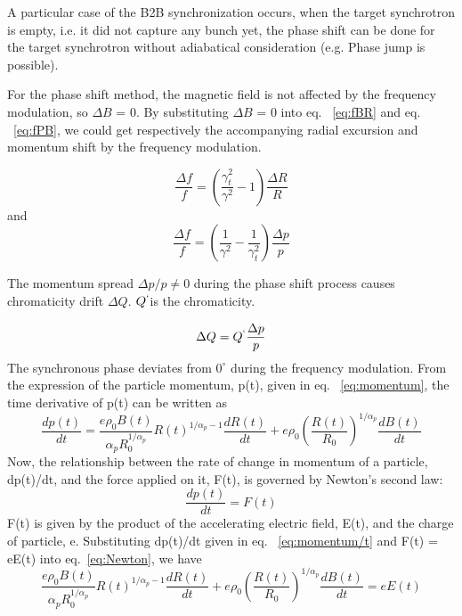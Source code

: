 A particular case of the B2B synchronization occurs, when the target synchrotron is empty, i.e. it did not capture any bunch yet, the phase shift can be done for the target synchrotron without adiabatical consideration (e.g. Phase jump is possible).

For the phase shift method, the magnetic field is not affected by the frequency modulation, so $\Delta{B}$ = 0. By substituting $\Delta{B}$ = 0 into eq. ~\ref{eq:fBR} and eq. ~\ref{eq:fPB}, we could get respectively the accompanying radial excursion and momentum shift    by the frequency modulation.

\begin{equation}
\label{eq:phaseR}
\frac{\Delta{f}}{f} =({\frac{\gamma_t^2}{\gamma^2}-1}) \frac{\Delta{R}}{R}
\end{equation}
and
\begin{equation}
\frac{\Delta{f}}{f} = (\frac{1}{\gamma^2}-\frac{1}{\gamma_t^2})\frac{\Delta{p}}{p}
\label{eq:phaseP}
\end{equation}


The momentum spread ${\Delta{p}}/{p} \neq 0$ during the phase shift process causes chromaticity drift $\Delta{Q}$. $Q^`$is the chromaticity.

\begin{equation}
\Delta{Q} = Q^`\frac{\Delta{p}}{p}
\label{eq:chromaticity}
\end{equation} 
The synchronous phase deviates from $0^\circ$ during the frequency modulation. From the expression of the particle momentum, p(t), given in eq. ~\ref{eq:momentum}, the time derivative of p(t) can be written as
\begin{equation}
\frac {dp(t)}{dt} = \frac {e\rho_0B(t)}{\alpha_pR_0^{1/\alpha_p}}R(t)^{1/\alpha_p-1}\frac{dR(t)}{dt}+e\rho_0 (\frac {R(t)}{R_0})^{1/\alpha_p }\frac{dB(t)}{dt}
\label{eq:momentum/t}
\end{equation} 
Now, the relationship between the rate of change in momentum of a particle, dp(t)/dt,
and the force applied on it, F(t), is governed by Newton’s second law:
\begin{equation}
\frac {dp(t)}{dt} = F(t)
\label{eq:Newton}
\end{equation} 
F(t) is given by the product of the accelerating electric field, E(t), and the
charge of particle, e. Substituting dp(t)/dt given in eq. ~\ref{eq:momentum/t} and F(t) = eE(t) into eq.~\ref{eq:Newton}, we have
\begin{equation}
 \frac {e\rho_0B(t)}{\alpha_pR_0^{1/\alpha_p}}R(t)^{1/\alpha_p-1}\frac{dR(t)}{dt}+e\rho_0 (\frac {R(t)}{R_0})^{1/\alpha_p }\frac{dB(t)}{dt}=eE(t)
\label{eq:f=eq}
\end{equation} 

